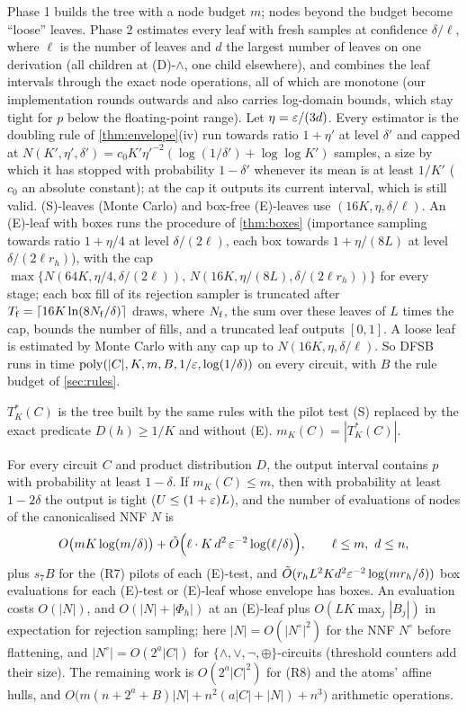 Phase 1 builds the tree with a node budget $m$; nodes beyond the budget become
``loose'' leaves. Phase 2 estimates every leaf with fresh samples at confidence
$\delta/\ell$, where $\ell$ is the number of leaves and $d$ the largest number of
leaves on one derivation (all children at (D)-$\wedge$, one child elsewhere), and
combines the leaf intervals through the exact node operations, all of which are
monotone (our implementation rounds outwards and also carries log-domain bounds,
which stay tight for $p$ below the floating-point range). Let $\eta=\varepsilon/(3d)$.
Every estimator is the doubling rule of \cref{thm:envelope}(iv) run towards ratio
$1+\eta'$ at level $\delta'$ and capped at
$N(K',\eta',\delta')=c_0K'\eta'^{-2}(\log(1/\delta')+\log\log K')$ samples, a size by
which it has stopped with probability $1-\delta'$ whenever its mean is at least
$1/K'$ ($c_0$ an absolute constant); at the cap it outputs its current interval,
which is still valid. (S)-leaves (Monte Carlo) and box-free (E)-leaves use
$(16K,\eta,\delta/\ell)$. An (E)-leaf with boxes runs the procedure of
\cref{thm:boxes} (importance sampling towards ratio $1+\eta/4$ at level
$\delta/(2\ell)$, each box towards $1+\eta/(8L)$ at level $\delta/(2\ell r_h)$), with
the cap $\max\{N(64K,\eta/4,\delta/(2\ell)),\,N(16K,\eta/(8L),\delta/(2\ell r_h))\}$
for every stage; each box fill of its rejection sampler is truncated after
$T_{\rm f}=\lceil16K\ln(8N_{\rm f}/\delta)\rceil$ draws, where $N_{\rm f}$, the sum over
these leaves of $L$ times the cap, bounds the number of fills, and a truncated leaf
outputs $[0,1]$.
A loose leaf is estimated by Monte Carlo with any cap up to $N(16K,\eta,\delta/\ell)$.
So DFSB runs in time $\mathrm{poly}(|C|,K,m,B,1/\varepsilon,\log(1/\delta))$ on every circuit, with
$B$ the rule budget of \cref{sec:rules}.

\begin{definition}
$T^*_K(C)$ is the tree built by the same rules with the pilot test (S)
replaced by the exact predicate $D(h)\ge1/K$ and without (E).
$m_K(C)=|T^*_K(C)|$.
\end{definition}

\begin{theorem}[DFSB]\label{thm:dfsb}
For every circuit $C$ and product distribution $D$, the output interval
contains $p$ with probability at least $1-\delta$. If $m_K(C)\le m$, then with
probability at least $1-2\delta$ the output is tight ($U\le(1+\varepsilon)L$), and the
number of evaluations of nodes of the canonicalised NNF $N$ is
\[
O\big(mK\log(m/\delta)\big)+\tilde O\Big(\ell\cdot K\,d^2\,\varepsilon^{-2}\log(\ell/\delta)\Big),\qquad
\ell\le m,\ d\le n,
\]
plus $s_7B$ for the (R7) pilots of each (E)-test, and
$\tilde O(r_hL^2Kd^2\varepsilon^{-2}\log(mr_h/\delta))$ box evaluations for each
(E)-test or (E)-leaf whose envelope has boxes. An evaluation costs $O(|N|)$, and
$O(|N|+|\Phi_h|)$ at an (E)-leaf plus $O(LK\max_j|B_j|)$ in expectation for
rejection sampling; here $|N|=O(|N^\circ|^2)$ for the NNF $N^\circ$ before flattening,
and $|N^\circ|=O(2^a|C|)$ for $\{\wedge,\vee,\neg,\oplus\}$-circuits (threshold
counters add their size). The remaining work is $O(2^a|C|^2)$ for (R8) and the atoms'
affine hulls, and $O\big(m(n+2^a+B)|N|+n^2(a|C|+|N|)+n^3\big)$ arithmetic
operations.
\end{theorem}

